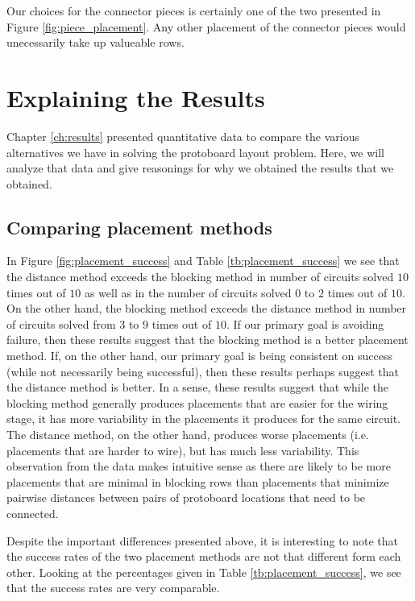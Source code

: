 Our choices for the connector pieces is certainly one of the two presented in
Figure \ref{fig:piece_placement}. Any other placement of the connector pieces
would unecessarily take up valueable rows.

\section{Explaining the Results}

Chapter \ref{ch:results} presented quantitative data to compare the various
alternatives we have in solving the protoboard layout problem. Here, we will
analyze that data and give reasonings for why we obtained the results
that we obtained.

\subsection{Comparing placement methods}

In Figure \ref{fig:placement_success} and Table \ref{tb:placement_success} we
see that the distance method exceeds the blocking method in number of circuits
solved $10$ times out of $10$ as well as in the number of circuits solved $0$
to $2$ times out of $10$. On the other hand, the blocking method exceeds the
distance method in number of circuits solved from $3$ to $9$ times out
of $10$. If our primary goal is avoiding failure, then these results suggest
that the blocking method is a better placement method. If, on the other hand,
our primary goal is being consistent on success (while not necessarily being
successful), then these results perhaps suggest that the distance method is
better. In a sense, these results suggest that while the blocking method
generally produces placements that are easier for the wiring stage, it has more
variability in the placements it produces for the same circuit. The distance
method, on the other hand, produces worse placements (i.e. placements that are
harder to wire), but has much less variability. This observation from the data
makes intuitive sense as there are likely to be more placements that are minimal
in blocking rows than placements that minimize pairwise distances between pairs
of protoboard locations that need to be connected.

Despite the important differences presented above, it is interesting to note
that the
success rates of the two placement methods are not that different form each
other. Looking at the percentages given in Table \ref{tb:placement_success}, we
see that the success rates are very comparable.

